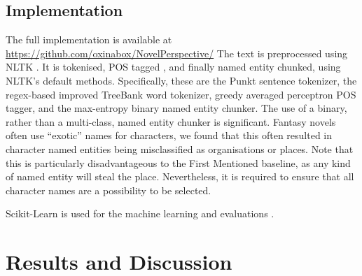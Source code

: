 \documentclass[11pt,a4paper]{article}
\newcommand{\parencite}{\citep}
\begin{document}
\subsection{Implementation}
The full implementation is available at \url{https://github.com/oxinabox/NovelPerspective/}
The text is preprocessed using NLTK \parencite{NLTK}.
It is tokenised, POS tagged , and finally named entity chunked, using NLTK's default methods.
Specifically, these are the Punkt sentence tokenizer, the regex-based improved TreeBank word tokenizer, greedy averaged perceptron POS tagger, and the max-entropy binary named entity chunker.
The use of a binary, rather than a multi-class, named entity chunker is significant.
Fantasy novels often use ``exotic'' names for characters, we found that this often resulted in character named entities being misclassified as organisations or places.
Note that this is particularly disadvantageous to the First Mentioned baseline, as any kind of named entity will steal the place.
Nevertheless, it is required to ensure that all character names are a possibility to be selected.

Scikit-Learn is used for the machine learning and evaluations \parencite{scikit-learn}.

\section{Results and Discussion}\label{sec:results-and-discussion}

\begin{table}
	\begin{adjustbox}{max width=\columnwidth}
		
	\end{adjustbox}
	
	\caption{The results of the character classifier systems. The best results are \textbf{bolded}.
	} \label{tbl:resmain}
\end{table}
\end{document}
